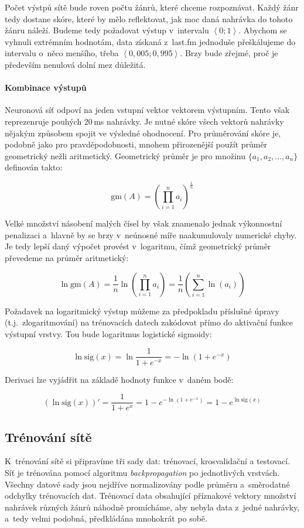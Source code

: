 \documentclass[10pt,a4paper]{article}
\begin{document}
Počet výstpů sítě bude roven počtu žánrů, které chceme rozpoznávat.
Každý žánr tedy dostane skóre, které by mělo reflektovat, jak moc daná nahrávka
do tohoto žánru náleží. Budeme tedy požadovat výstup v~intervalu $\left<0; 1\right>$.
Abychom se vyhnuli extrémním hodnotám, data získaná z~last.fm jednoduše přeškálujeme
do intervalu o~něco menšího, třeba $\left<0,005; 0,995\right>$. Brzy bude zřejmé, proč je především
nenulová dolní mez důležitá.

\paragraph{Kombinace výstupů} Neuronová síť odpoví na jeden vstupní vektor vektorem výstupním.
Tento však reprezenruje pouhých 20\,ms nahrávky.
Je nutné skóre všech vektorů nahrávky nějakým způsobem spojit ve výsledné ohodnocení.
Pro průměrování skóre je, podobně jako pro pravděpodobnosti, mnohem přirozenější
použít průměr geometrický nežli aritmetický.
Geometrický průměr je pro množinu $\{a_1,a_2,\ldots,a_n\}$ definován takto:

$$ \mbox{gm}(A) = \left(\prod_{i=1}^na_i\right)^{\frac{1}{n}} $$

Velké množství násobení malých čísel by však znamenalo jednak výkonnostní
penalizaci a~hlavně by se brzy v~neúnosné míře naakumulovaly numerické chyby.
Je tedy lepší daný výpočet provést v~logaritmu, čímž geometrický průměr
převedeme na průměr aritmetický:

$$
\ln\mbox{gm}(A)
= \frac{1}{n}\ln\left(\prod_{i=1}^na_i\right)
= \frac{1}{n}\left(\sum_{i=1}^n\ln(a_i)\right)
$$

Požadavek na logaritmický výstup můžeme za předpokladu příslušné úpravy (t.j.~zlogaritmování)
na trénovacích datech zakódovat přímo do aktivační funkce výstupní vrstvy.
Tou bude logaritmus logistické sigmoidy:

$$ \ln\mbox{sig}(x) = \ln\frac{1}{1+e^{-x}} = -\ln(1 + e^{-x}) $$

Derivaci lze vyjádřit na základě hodnoty funkce v~daném bodě:

$$ (\ln\mbox{sig}(x))' = \frac{1}{1+e^{x}} = 1-e^{-\ln(1 + e^{-x})} = 1 - e^{\ln\mathrm{sig}(x)} $$

\subsection{Trénování sítě}

K~trénování sítě si připravíme tři sady dat: trénovací, krosvalidační a testovací.
Síť je trénována pomocí algoritmu \emph{backpropagation} po jednotlivých vrstvách.
Všechny datové sady jsou nejdříve normalizovány podle průměru a~směrodatné odchylky
trénovacích dat. Trénovací data obsahující příznakové vektory množství nahrávek různých
žánrů náhodně promícháme, aby nebyla data z~jedné nahrávky, a~tedy velmi podobná,
předkládána mnohokrát po sobě.
\end{document}

